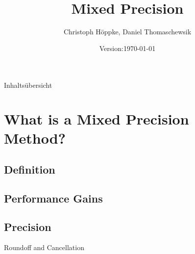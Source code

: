 \documentclass[10pt]{beamer}
\title{Mixed Precision}
\author{Christoph Höppke, Daniel Thomaschewsik}
\institute[TU Dortmund]{TU Dortmund}
\date{Version:\today}
\begin{document}
\begin{frame}[c]
  \titlepage
\end{frame}

\logo{}

\begin{frame}{Inhaltsübersicht}
\tableofcontents

\end{frame}
\section{What is a Mixed Precision Method?}
\subsection{Definition}
\begin{frame}[c]

\end{frame}


\subsection{Performance Gains}
\begin{frame}

\end{frame}

\subsection{Precision}
\begin{frame}{Roundoff and Cancellation}

\end{frame}
\end{document}
